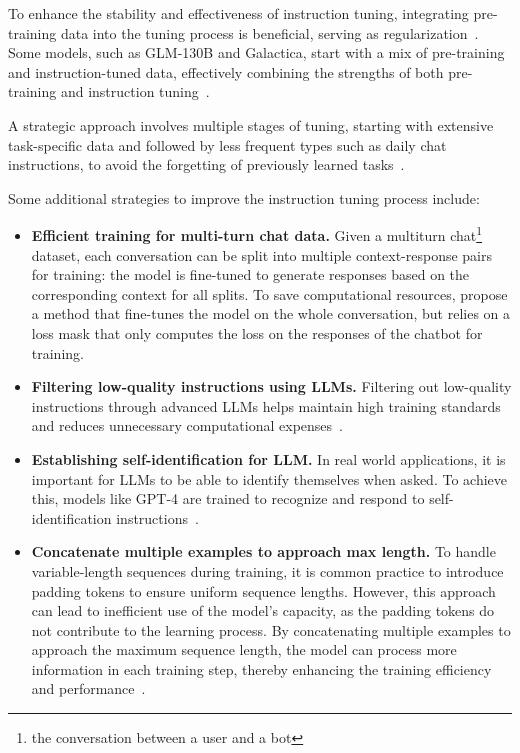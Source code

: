 To enhance the stability and effectiveness of instruction tuning, integrating pre-training data into the tuning process is beneficial, serving as regularization~\cite{wei2022fine}.
Some models, such as GLM-130B and Galactica, start with a mix of pre-training and instruction-tuned data, effectively combining the strengths of both pre-training and instruction tuning~\cite{chowdhery2022palm, lewis2021paLM}.

A strategic approach involves multiple stages of tuning, starting with extensive task-specific data and followed by less frequent types such as daily chat instructions, to avoid the forgetting of previously learned tasks~\cite{raffel2023exploring}.

Some additional strategies to improve the instruction tuning process include:
\begin{itemize}
	\item \textbf{Efficient training for multi-turn chat data.} {Given a multiturn chat\footnote{the conversation between a user and a bot} dataset, each conversation can be split into multiple context-response pairs for training: the model is fine-tuned to generate responses based on the corresponding context for all splits. To save computational resources, \textcite{chiang2023vicuna} propose a method that fine-tunes the model on the whole conversation, but relies on a loss mask that only computes the loss on the responses of the chatbot for training.
	      }
	\item \textbf{Filtering low-quality instructions using LLMs.} {Filtering out low-quality instructions through advanced LLMs helps maintain high training standards and reduces unnecessary computational expenses~\cite{wei2022fine}.}
	\item \textbf{Establishing self-identification for LLM.} {In real world applications, it is important for LLMs to be able to identify themselves when asked. To achieve this, models like GPT-4 are trained to recognize and respond to self-identification instructions~\cite{radford2023gpt4}.
	      }
	\item \textbf{Concatenate multiple examples to approach max length.} {
		      To handle variable-length sequences during training, it is common practice to introduce padding tokens to ensure uniform sequence lengths. However, this approach can lead to inefficient use of the model's capacity, as the padding tokens do not contribute to the learning process. By concatenating multiple examples to approach the maximum sequence length, the model can process more information in each training step, thereby enhancing the training efficiency and performance~\cite{krell2021efficient}.
}
\end{itemize}
